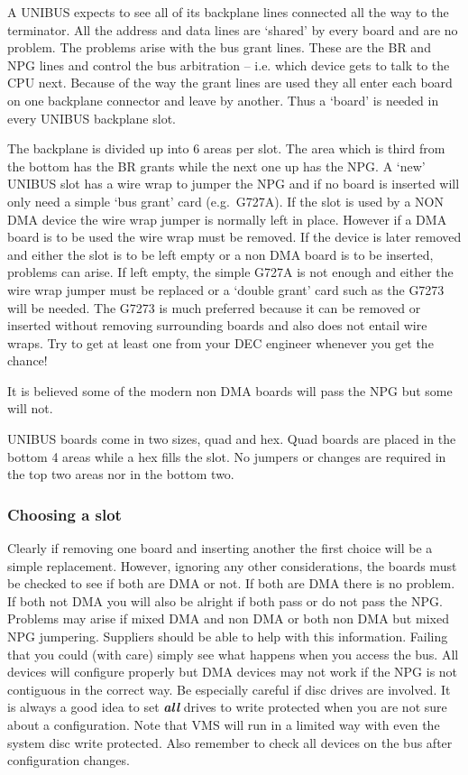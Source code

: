 A UNIBUS expects to see all of its backplane lines connected all
 the way to the terminator.
All the address and data lines are `shared' by every board and are no problem.
The problems arise with the bus grant lines.
These are the BR and NPG lines and control the bus arbitration -- i.e. which
 device gets to talk to the CPU next.
Because of the way the grant lines are
 used they all enter each board on one backplane connector and leave by another.
 Thus a `board' is needed in every UNIBUS backplane slot.

The backplane is divided up into 6 areas per slot.
The area which is
 third from the bottom has the BR grants while the next one up has the NPG.
 A `new' UNIBUS slot has a wire wrap to jumper the NPG and if no board is
 inserted will only need a simple `bus grant' card (e.g.\ G727A).
If the slot
 is used by a NON DMA device the wire wrap jumper is normally left in place.
 However if a DMA board is to be used the wire wrap must be removed.
If the device is later removed and either the slot is to be left empty or
a non DMA board is to be inserted, problems can arise.
If left empty, the simple G727A is not enough and either the wire wrap jumper
must be replaced or a `double grant' card such as the G7273 will be needed.
The G7273 is much  preferred because it can be removed or inserted
without removing surrounding boards and also does not entail wire wraps.
Try to get at least one from your DEC engineer whenever you get the chance!

It is believed some of the modern non DMA boards will pass the NPG but
some will not.

UNIBUS boards come in two sizes, quad and hex.
Quad boards are placed in the bottom 4 areas while a hex fills the slot.
No jumpers or changes are required in the top two areas nor in the bottom two.

\subsubsection{Choosing a slot}

Clearly if removing one board and inserting another the
first  choice will be a simple replacement.
However, ignoring any other considerations, the boards must be checked to
see if both are DMA or not.
If both are DMA there is no problem.
If both not DMA you will also be alright if both  pass or do not pass the NPG.
 Problems may arise if mixed DMA and non DMA or both non DMA but mixed NPG
jumpering.
Suppliers should be able to help with this information.
Failing that you could (with care) simply see what happens when you access
the bus.
All devices will configure properly  but DMA devices may not work if the
NPG is not contiguous in the correct way.
Be especially  careful if disc drives are involved.
It is always a good idea to set {\bf \it all}  drives to write protected when
you are not sure about a configuration.
Note that VMS will run in a limited way with even the system disc write
protected.
Also remember to check all devices on the bus after configuration changes.

